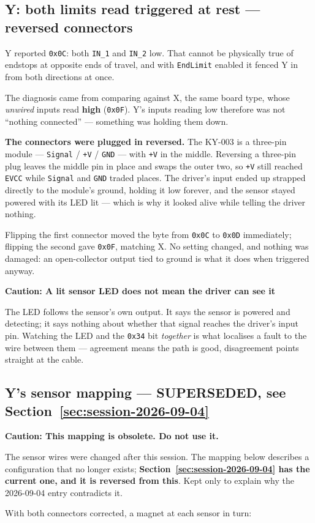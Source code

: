 \documentclass[11pt,letterpaper]{article}
\newenvironment{caution}[1]{%
    \par\addvspace{8pt}%
    \noindent{\color{cautionred}\rule{\linewidth}{0.8pt}}\par\vspace{2pt}
    \noindent\textbf{\color{cautionred}Caution: #1}\par\vspace{2pt}
}{%
    \par\vspace{2pt}\noindent{\color{cautionred}\rule{\linewidth}{0.4pt}}%
    \par\addvspace{8pt}%
}
\begin{document}
\subsection{Y: both limits read triggered at rest --- reversed connectors}
Y reported \texttt{0x0C}: both \texttt{IN\_1} and \texttt{IN\_2} low. That cannot
be physically true of endstops at opposite ends of travel, and with
\texttt{EndLimit} enabled it fenced Y in from both directions at once.

The diagnosis came from comparing against X, the same board type, whose
\emph{unwired} inputs read \textbf{high} (\texttt{0x0F}). Y's inputs reading low
therefore was not ``nothing connected'' --- something was holding them down.

\textbf{The connectors were plugged in reversed.} The KY-003 is a three-pin module
--- \texttt{Signal} / \texttt{+V} / \texttt{GND} --- with \texttt{+V} in the
middle. Reversing a three-pin plug leaves the middle pin in place and swaps the
outer two, so \texttt{+V} still reached \texttt{EVCC} while \texttt{Signal} and
\texttt{GND} traded places. The driver's input ended up strapped directly to the
module's ground, holding it low forever, and the sensor stayed powered with its
LED lit --- which is why it looked alive while telling the driver nothing.

Flipping the first connector moved the byte from \texttt{0x0C} to \texttt{0x0D}
immediately; flipping the second gave \texttt{0x0F}, matching X. No setting
changed, and nothing was damaged: an open-collector output tied to ground is what
it does when triggered anyway.

\begin{caution}{A lit sensor LED does not mean the driver can see it}
The LED follows the sensor's own output. It says the sensor is powered and
detecting; it says nothing about whether that signal reaches the driver's input
pin. Watching the LED and the \texttt{0x34} bit \emph{together} is what localises
a fault to the wire between them --- agreement means the path is good,
disagreement points straight at the cable.
\end{caution}

\subsection{Y's sensor mapping \textmd{\normalsize --- SUPERSEDED, see
Section~\ref{sec:session-2026-09-04}}}
\begin{caution}{This mapping is obsolete. Do not use it.}
The sensor wires were changed after this session. The mapping below describes a
configuration that no longer exists; \textbf{Section~\ref{sec:session-2026-09-04}
has the current one, and it is reversed from this}. Kept only to explain why the
2026-09-04 entry contradicts it.
\end{caution}
With both connectors corrected, a magnet at each sensor in turn:
\end{document}
